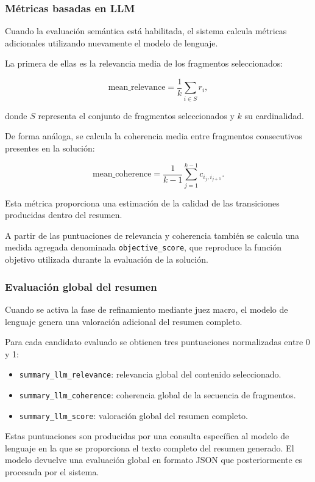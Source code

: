 \documentclass[12pt,a4paper]{article}
\begin{document}
\subsubsection{Métricas basadas en LLM}

Cuando la evaluación semántica está habilitada, el sistema calcula métricas adicionales utilizando nuevamente el modelo de lenguaje.

La primera de ellas es la relevancia media de los fragmentos seleccionados:

\[
\text{mean\_relevance}
=
\frac{1}{k}
\sum_{i \in S}
r_i,
\]

donde \(S\) representa el conjunto de fragmentos seleccionados y \(k\) su cardinalidad.

De forma análoga, se calcula la coherencia media entre fragmentos consecutivos presentes en la solución:

\[
\text{mean\_coherence}
=
\frac{1}{k-1}
\sum_{j=1}^{k-1}
c_{i_j,i_{j+1}}.
\]

Esta métrica proporciona una estimación de la calidad de las transiciones producidas dentro del resumen.

A partir de las puntuaciones de relevancia y coherencia también se calcula una medida agregada denominada \texttt{objective\_score}, que reproduce la función objetivo utilizada durante la evaluación de la solución.

\subsubsection{Evaluación global del resumen}

Cuando se activa la fase de refinamiento mediante juez macro, el modelo de lenguaje genera una valoración adicional del resumen completo.

Para cada candidato evaluado se obtienen tres puntuaciones normalizadas entre 0 y 1:

\begin{itemize}
\item \texttt{summary\_llm\_relevance}: relevancia global del contenido seleccionado.
\item \texttt{summary\_llm\_coherence}: coherencia global de la secuencia de fragmentos.
\item \texttt{summary\_llm\_score}: valoración global del resumen completo.
\end{itemize}

Estas puntuaciones son producidas por una consulta específica al modelo de lenguaje en la que se proporciona el texto completo del resumen generado. El modelo devuelve una evaluación global en formato JSON que posteriormente es procesada por el sistema.
\end{document}

